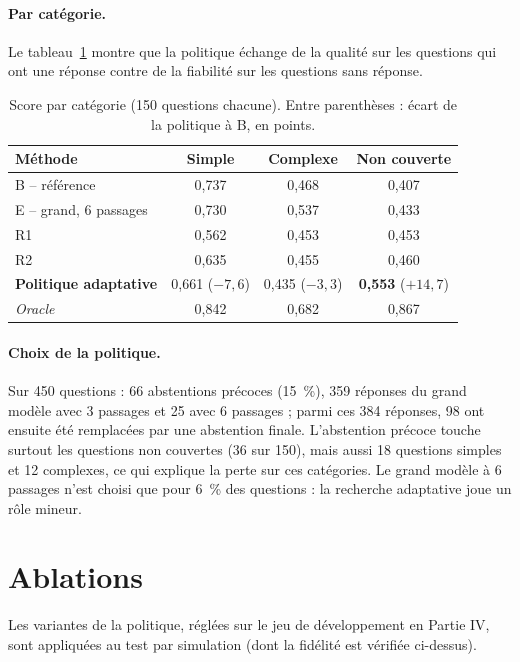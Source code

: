 \documentclass[11pt,a4paper]{article}
\begin{document}
\paragraph{Par catégorie.} Le tableau~\ref{tab:categories} montre que la politique échange de la
qualité sur les questions qui ont une réponse contre de la fiabilité sur les questions sans réponse.

\begin{table}[H]
\centering\small
\begin{tabular}{l c c c}
\toprule
Méthode & Simple & Complexe & Non couverte \\
\midrule
B -- référence & 0,737 & 0,468 & 0,407 \\
E -- grand, 6 passages & 0,730 & 0,537 & 0,433 \\
R1 & 0,562 & 0,453 & 0,453 \\
R2 & 0,635 & 0,455 & 0,460 \\
\textbf{Politique adaptative} & 0,661 ($-7{,}6$) & 0,435 ($-3{,}3$) & \textbf{0,553} ($+14{,}7$) \\
\textit{Oracle} & 0,842 & 0,682 & 0,867 \\
\bottomrule
\end{tabular}
\caption{Score par catégorie (150 questions chacune). Entre parenthèses : écart de la politique à B, en points.}
\label{tab:categories}
\end{table}

\paragraph{Choix de la politique.} Sur 450 questions : 66 abstentions précoces (15~\%), 359 réponses du
grand modèle avec 3 passages et 25 avec 6 passages ; parmi ces 384 réponses, 98 ont ensuite été
remplacées par une abstention finale. L'abstention précoce touche surtout les questions non couvertes
(36 sur 150), mais aussi 18 questions simples et 12 complexes, ce qui explique la perte sur ces
catégories. Le grand modèle à 6 passages n'est choisi que pour 6~\% des questions : la recherche
adaptative joue un rôle mineur.

\section{Ablations}\label{sec:ablations}

Les variantes de la politique, réglées sur le jeu de développement en Partie IV, sont appliquées
au test par simulation (dont la fidélité est vérifiée ci-dessus).
\end{document}
